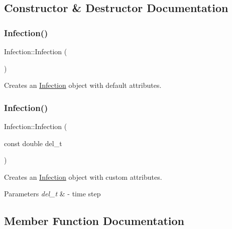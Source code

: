 \subsection{Constructor \& Destructor Documentation}
\mbox{\label{classInfection_a5babe90927f5311c1186e3328bef6029}} 
\subsubsection{\texorpdfstring{Infection()}{Infection()}\hspace{0.1cm}{\footnotesize\ttfamily [1/2]}}
{\footnotesize\ttfamily Infection\+::\+Infection (\begin{DoxyParamCaption}{ }\end{DoxyParamCaption})\hspace{0.3cm}{\ttfamily [default]}}



Creates an \hyperlink{classInfection}{Infection} object with default attributes. 

\mbox{\label{classInfection_a590c592f4bfbd74549ec8ba71ab5f52c}} 
\subsubsection{\texorpdfstring{Infection()}{Infection()}\hspace{0.1cm}{\footnotesize\ttfamily [2/2]}}
{\footnotesize\ttfamily Infection\+::\+Infection (\begin{DoxyParamCaption}\item[{const double}]{del\+\_\+t }\end{DoxyParamCaption})\hspace{0.3cm}{\ttfamily [inline]}}



Creates an \hyperlink{classInfection}{Infection} object with custom attributes. 


\begin{DoxyParams}{Parameters}
{\em del\+\_\+t} & -\/ time step \\
\hline
\end{DoxyParams}


\subsection{Member Function Documentation}
\mbox{\label{classInfection_ae1c34ce8c8e545529c5a3178bd6c1362}} 

